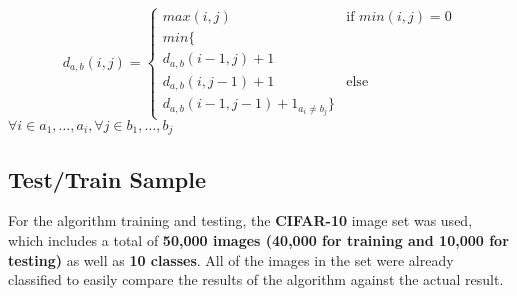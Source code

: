 \documentclass[conference,compsoc]{IEEEtran}
\begin{document}
\[ d_{a,b}(i, j) =
  \begin{cases}
    max(i, j)       & \text{if } min(i, j) = 0\\
    min \{ \\ d_{a,b}(i-1, j) + 1 \\  d_{a,b}(i, j-1) + 1 & \text{else} \\ d_{a,b}(i-1, j-1) + 1_{a_i \neq b_j}  \}
  \end{cases}
\]
\(\forall i \in a_1, \dotsc, a_i, \forall j \in b_1, \dotsc, b_j\)

\subsection{Test/Train Sample}
For the algorithm training and testing, the \textbf{CIFAR-10} image set was used, which includes a total of \textbf{50,000 images (40,000 for training and 10,000 for testing)} as well as \textbf{10 classes}. All of the images in the set were already classified to easily compare the results of the algorithm against the actual result.
\end{document}
